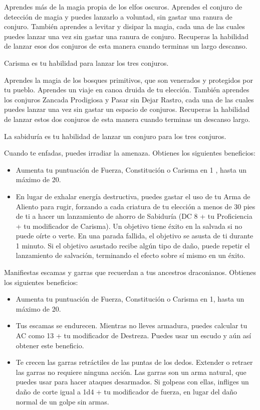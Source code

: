 \documentclass[a4paper,twocolumn,openany,10pt]{dndbook}
\begin{document}
Aprendes más de la magia propia de los elfos oscuros. Aprendes el conjuro de detección de magia y puedes lanzarlo a voluntad,
sin gastar una ranura de conjuro. También aprendes a levitar y disipar la magia, cada una de las cuales puedes lanzar una vez
sin gastar una ranura de conjuro. Recuperas la habilidad de lanzar esos dos conjuros de esta manera cuando terminas un largo
descanso.

Carisma es tu habilidad para lanzar los tres conjuros. 

Aprendes la magia de los bosques primitivos, que son venerados y protegidos por tu pueblo. Aprendes un viaje en canoa druida de
tu elección. También aprendes los conjuros Zancada Prodigiosa y Pasar sin Dejar Rastro, cada una de las cuales puedes lanzar una
vez sin gastar un espacio de conjuros. Recuperas la habilidad de lanzar estos dos conjuros de esta manera cuando terminas un
descanso largo.

La sabiduría es tu habilidad de lanzar un conjuro para los tres conjuros.

Cuando te enfadas, puedes irradiar la amenaza. Obtienes los siguientes beneficios:
\begin{itemize}
\item Aumenta tu puntuación de Fuerza, Constitución o Carisma en 1 , hasta un máximo de 20.
\item En lugar de exhalar energía destructiva, puedes gastar el uso de tu Arma de Aliento para rugir, forzando a cada criatura
de tu elección a menos de 30 pies de ti a hacer un lanzamiento de ahorro de Sabiduría (DC 8 + tu Proficiencia + tu modificador
de Carisma). Un objetivo tiene éxito en la salvada si no puede oírte o verte. En una parada fallida, el objetivo se asusta de
ti durante 1 minuto. Si el objetivo asustado recibe algún tipo de daño, puede repetir el lanzamiento de salvación, terminando el
efecto sobre sí mismo en un éxito.
\end{itemize}

Manifiestas escamas y garras que recuerdan a tus ancestros draconianos. Obtienes los siguientes beneficios:
\begin{itemize}
\item Aumenta tu puntuación de Fuerza, Constitución o Carisma en 1, hasta un máximo de 20.
\item Tus escamas se endurecen. Mientras no lleves armadura, puedes calcular tu AC como 13 + tu modificador de Destreza. Puedes
usar un escudo y aún así obtener este beneficio.
\item Te crecen las garras retráctiles de las puntas de los dedos. Extender o retraer las garras no requiere ninguna acción. Las
garras son un arma natural, que puedes usar para hacer ataques desarmados. Si golpeas con ellas, infliges un daño de corte igual
a 1d4 + tu modificador de fuerza, en lugar del daño normal de un golpe sin armas.
\end{itemize}
\end{document}
